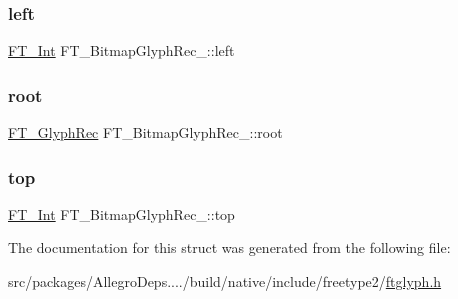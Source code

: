 \mbox{\label{struct_f_t___bitmap_glyph_rec___a6cfd2d89af7b6be4af886047c9cb7e0a}} 
\subsubsection{\texorpdfstring{left}{left}}
{\footnotesize\ttfamily \hyperlink{fttypes_8h_af90e5fb0d07e21be9fe6faa33f02484c}{F\+T\+\_\+\+Int} F\+T\+\_\+\+Bitmap\+Glyph\+Rec\+\_\+\+::left}

\mbox{\label{struct_f_t___bitmap_glyph_rec___ac3970353fbc0fe3d4c59c3fd608140f3}} 
\subsubsection{\texorpdfstring{root}{root}}
{\footnotesize\ttfamily \hyperlink{ftglyph_8h_a095b515f46c978b33ffc9c20aad081a4}{F\+T\+\_\+\+Glyph\+Rec} F\+T\+\_\+\+Bitmap\+Glyph\+Rec\+\_\+\+::root}

\mbox{\label{struct_f_t___bitmap_glyph_rec___a25fc81296678d6a2d064843c01bc05f7}} 
\subsubsection{\texorpdfstring{top}{top}}
{\footnotesize\ttfamily \hyperlink{fttypes_8h_af90e5fb0d07e21be9fe6faa33f02484c}{F\+T\+\_\+\+Int} F\+T\+\_\+\+Bitmap\+Glyph\+Rec\+\_\+\+::top}



The documentation for this struct was generated from the following file\+:\begin{DoxyCompactItemize}
\item 
src/packages/\+Allegro\+Deps..../build/native/include/freetype2/\hyperlink{ftglyph_8h}{ftglyph.\+h}\end{DoxyCompactItemize}
